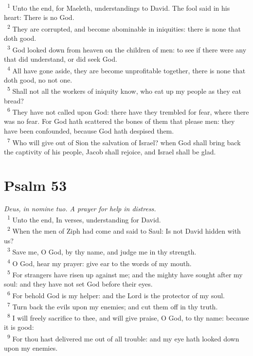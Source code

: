 \documentclass[a5paper,12pt]{article}
\begin{document}
\begin{multicols*}{2}
~\textsuperscript{1} Unto the end, for Maeleth, understandings to David. The fool said in his heart: There is no God.\\
~\textsuperscript{2} They are corrupted, and become abominable in iniquities: there is none that doth good.\\
~\textsuperscript{3} God looked down from heaven on the children of men: to see if there were any that did understand, or did seek God.\\
~\textsuperscript{4} All have gone aside, they are become unprofitable together, there is none that doth good, no not one.\\
~\textsuperscript{5} Shall not all the workers of iniquity know, who eat up my people as they eat bread?\\
~\textsuperscript{6} They have not called upon God: there have they trembled for fear, where there was no fear. For God hath scattered the bones of them that please men: they have been confounded, because God hath despised them.\\
~\textsuperscript{7} Who will give out of Sion the salvation of Israel? when God shall bring back the captivity of his people, Jacob shall rejoice, and Israel shall be glad.\\

\section{Psalm 53}
\label{sec:orgfe4d955}
\emph{Deus, in nomine tuo. A prayer for help in distress.}\\

~\textsuperscript{1} Unto the end, In verses, understanding for David.\\
~\textsuperscript{2} When the men of Ziph had come and said to Saul: Is not David hidden with us?\\
~\textsuperscript{3} Save me, O God, by thy name, and judge me in thy strength.\\
~\textsuperscript{4} O God, hear my prayer: give ear to the words of my mouth.\\
~\textsuperscript{5} For strangers have risen up against me; and the mighty have sought after my soul: and they have not set God before their eyes.\\
~\textsuperscript{6} For behold God is my helper: and the Lord is the protector of my soul.\\
~\textsuperscript{7} Turn back the evils upon my enemies; and cut them off in thy truth.\\
~\textsuperscript{8} I will freely sacrifice to thee, and will give praise, O God, to thy name: because it is good:\\
~\textsuperscript{9} For thou hast delivered me out of all trouble: and my eye hath looked down upon my enemies.\\


\end{multicols*}
\end{document}
